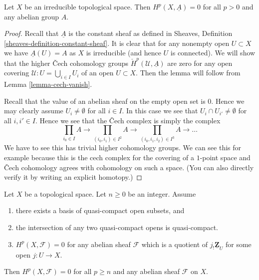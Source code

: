 \begin{lemma}
\label{lemma-irreducible-constant-cohomology-zero}
Let $X$ be an irreducible topological space.
Then $H^p(X, \underline{A}) = 0$ for all $p > 0$
and any abelian group $A$.
\end{lemma}

\begin{proof}
Recall that $\underline{A}$ is the constant sheaf as defined
in Sheaves, Definition \ref{sheaves-definition-constant-sheaf}.
It is clear that for any nonempty
open $U \subset X$ we have $\underline{A}(U) = A$ as $X$ is
irreducible (and hence $U$ is connected).
We will show that the higher {\v C}ech cohomology groups
$\check{H}^p(\mathcal{U}, \underline{A})$ are zero for
any open covering $\mathcal{U} : U = \bigcup_{i\in I} U_i$
of an open $U \subset X$. Then the lemma will follow
from Lemma \ref{lemma-cech-vanish}.

\medskip\noindent
Recall that the value of an abelian
sheaf on the empty open set is $0$. Hence we may clearly assume
$U_i \not = \emptyset$ for all $i \in I$. In this case we see
that $U_i \cap U_{i'} \not = \emptyset$ for all $i, i' \in I$.
Hence we see that the {\v C}ech complex is simply the complex
$$
\prod_{i_0 \in I} A \to
\prod_{(i_0, i_1) \in I^2} A \to
\prod_{(i_0, i_1, i_2) \in I^3} A \to
\ldots
$$
We have to see this has trivial higher cohomology groups.
We can see this for example because this is the cech complex for the covering
of a $1$-point space and {\v C}ech cohomology agrees with cohomology
on such a space. (You can also directly verify it
by writing an explicit homotopy.)
\end{proof}

\begin{lemma}
\label{lemma-vanishing-generated-one-section}
Let $X$ be a topological space. Let $n \geq 0$ be an integer.
Assume
\begin{enumerate}
\item there exists a basis of quasi-compact open subsets, and
\item the intersection of any two quasi-compact opens is quasi-compact.
\item $H^p(X, \mathcal{F}) = 0$ for any abelian sheaf $\mathcal{F}$
which is a quotient of $j_{!}\underline{\mathbf{Z}}_U$ for some open
$j : U \to X$.
\end{enumerate}
Then $H^p(X, \mathcal{F}) = 0$ for all $p \geq n$
and any abelian sheaf $\mathcal{F}$ on $X$.
\end{lemma}


